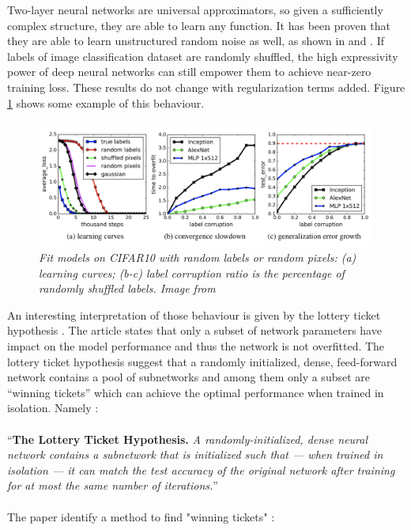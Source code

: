 \documentclass[11pt,a4paper]{article}
\begin{document}
Two-layer neural networks are universal approximators, so given a sufficiently complex structure, they are able to learn any function. 
It has been proven that they are able to learn unstructured random noise as well, as shown in \cite{rethink} and \cite{Mit-overfit}. 
If labels of image classification dataset are randomly shuffled, the high expressivity power of deep neural networks can still empower them to achieve near-zero training loss. 
These results do not change with regularization terms added. 
Figure \ref{random-labels} shows some example of this behaviour.

\begin{figure}[H]
 \centering
 \includegraphics[scale=0.46]{../images/fit-random-labels-zhang.png}
 \caption{\textit{Fit models on CIFAR10 with random labels or random pixels: (a) learning curves; (b-c) label corruption ratio is the percentage of randomly shuffled labels. Image from \cite{rethink}}}  
 \label{random-labels}
\end{figure}

An interesting interpretation of those behaviour is given by the lottery ticket hypothesis \cite{lottery}. The article states that only a subset of network parameters have impact on the model performance and thus the network is not overfitted. The lottery ticket hypothesis suggest that a randomly initialized, dense, feed-forward network contains a pool of subnetworks and among them only a subset are “winning tickets” which can achieve the optimal performance when trained in isolation. Namely : 
\\
\\
``{\bf The Lottery Ticket Hypothesis.} {\it A randomly-initialized, dense neural network contains a subnetwork that is initialized such that — when trained in isolation — it can match the test accuracy of the original network after training for at most the same number of iterations.}'' \cite{lottery}
\\
\\
The paper identify a method to find "winning tickets" : 
\end{document}
